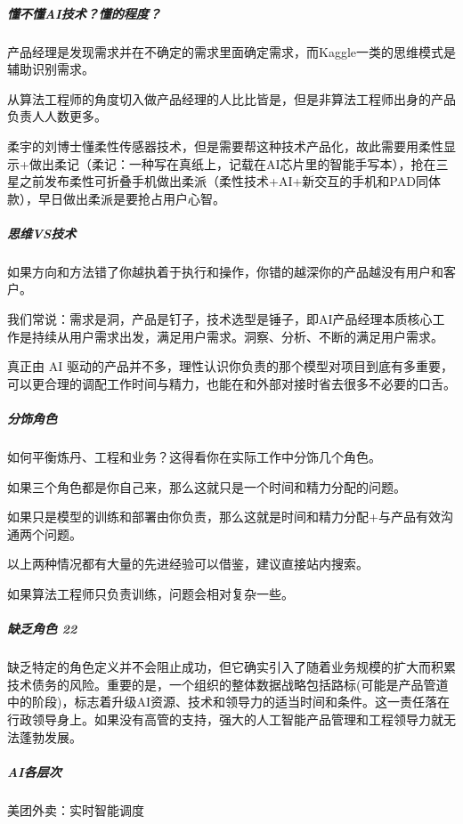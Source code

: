 \documentclass[letterpaper,11pt,english]{sphinxmanual}
\begin{document}
\subparagraph{懂不懂AI技术？懂的程度？}
\label{\detokenize{chapter_introduction/AI_PM:id20}}
产品经理是发现需求并在不确定的需求里面确定需求，而Kaggle一类的思维模式是辅助识别需求。

从算法工程师的角度切入做产品经理的人比比皆是，但是非算法工程师出身的产品负责人人数更多。

柔宇的刘博士懂柔性传感器技术，但是需要帮这种技术产品化，故此需要用柔性显示+做出柔记（柔记：一种写在真纸上，记载在AI芯片里的智能手写本），抢在三星之前发布柔性可折叠手机做出柔派（柔性技术+AI+新交互的手机和PAD同体款），早日做出柔派是要抢占用户心智。


\subparagraph{思维VS技术}
\label{\detokenize{chapter_introduction/AI_PM:vs}}
如果方向和方法错了你越执着于执行和操作，你错的越深你的产品越没有用户和客户。

我们常说：需求是洞，产品是钉子，技术选型是锤子，即AI产品经理本质核心工作是持续从用户需求出发，满足用户需求。洞察、分析、不断的满足用户需求。

真正由 AI
驱动的产品并不多，理性认识你负责的那个模型对项目到底有多重要，可以更合理的调配工作时间与精力，也能在和外部对接时省去很多不必要的口舌。


\subparagraph{分饰角色}
\label{\detokenize{chapter_introduction/AI_PM:id21}}
如何平衡炼丹、工程和业务？这得看你在实际工作中分饰几个角色。

如果三个角色都是你自己来，那么这就只是一个时间和精力分配的问题。

如果只是模型的训练和部署由你负责，那么这就是时间和精力分配+与产品有效沟通两个问题。

以上两种情况都有大量的先进经验可以借鉴，建议直接站内搜索。

如果算法工程师只负责训练，问题会相对复杂一些。


\subparagraph{缺乏角色 22\sphinxfootnotemark[249]}
\label{\detokenize{chapter_introduction/AI_PM:id22}}%
\begin{footnotetext}[249]\sphinxAtStartFootnote
{}
%
\end{footnotetext}\ignorespaces 
缺乏特定的角色定义并不会阻止成功，但它确实引入了随着业务规模的扩大而积累技术债务的风险。重要的是，一个组织的整体数据战略包括路标(可能是产品管道中的阶段)，标志着升级AI资源、技术和领导力的适当时间和条件。这一责任落在行政领导身上。如果没有高管的支持，强大的人工智能产品管理和工程领导力就无法蓬勃发展。


\subparagraph{AI各层次}
\label{\detokenize{chapter_introduction/AI_PM:id23}}
美团外卖：实时智能调度
\end{document}
